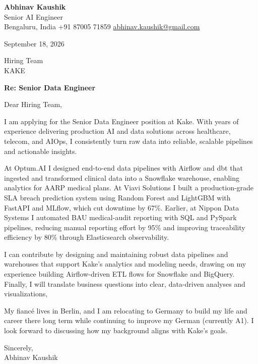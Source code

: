 \documentclass[11pt,a4paper]{article}
\begin{document}
{\Large\bfseries Abhinav Kaushik}\\
Senior AI Engineer\\
Bengaluru, India \textbar{} +91 87005 71859 \textbar{} \href{mailto:abhinav.kaushik@gmail.com}{abhinav.kaushik@gmail.com}

September 18, 2026

Hiring Team\\
KAKE

\textbf{Re: Senior Data Engineer}

Dear Hiring Team,

I am applying for the Senior Data Engineer position at Kake. With years of experience delivering production AI and data solutions across healthcare, telecom, and AIOps, I consistently turn raw data into reliable, scalable pipelines and actionable insights.

At Optum.AI I designed end-to-end data pipelines with Airflow and dbt that ingested and transformed clinical data into a Snowflake warehouse, enabling analytics for AARP medical plans. At Viavi Solutions I built a production-grade SLA breach prediction system using Random Forest and LightGBM with FastAPI and MLflow, which cut downtime by 67\%. Earlier, at Nippon Data Systems I automated BAU medical-audit reporting with SQL and PySpark pipelines, reducing manual reporting effort by 95\% and improving traceability efficiency by 80\% through Elasticsearch observability.

I can contribute by designing and maintaining robust data pipelines and warehouses that support Kake's analytics and modeling needs, drawing on my experience building Airflow-driven ETL flows for Snowflake and BigQuery. Finally, I will translate business questions into clear, data-driven analyses and visualizations,

My fiancé lives in Berlin, and I am relocating to Germany to build my life and career there long term while continuing to improve my German (currently A1). I look forward to discussing how my background aligns with Kake's goals.

Sincerely,\\[4pt]
Abhinav Kaushik
\end{document}
